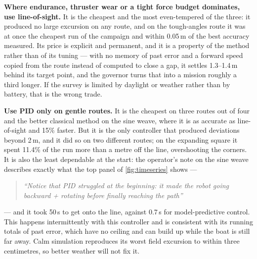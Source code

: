 \documentclass[11pt]{article}
\newcommand{\opquote}[1]{%
  \begin{quote}\itshape\small #1\end{quote}%
}
\begin{document}
\textbf{Where endurance, thruster wear or a tight force budget dominates, use
line-of-sight.} It is the cheapest and the most even-tempered of the three: it produced no
large excursion on any route, and on the tough-angles route it was at once the cheapest run
of the campaign and within 0.05\,m of the best accuracy measured. Its price is explicit and
permanent, and it is a property of the method rather than of its tuning --- with no memory of
past error and a forward speed copied from the route instead of computed to close a gap, it
settles 1.3--1.4\,m behind its target point, and the governor turns that into a mission
roughly a third longer. If the survey is limited by daylight or weather rather than by
battery, that is the wrong trade.

\textbf{Use PID only on gentle routes.} It is the cheapest on three routes out of four and
the better classical method on the sine weave, where it is as accurate as line-of-sight and
15\% faster. But it is the only controller that produced deviations beyond 2\,m, and it did
so on two different routes; on the expanding square it spent 11.4\% of the run more than a
metre off the line, overshooting the corners. It is also the least dependable at the start:
the operator's note on the sine weave describes exactly what the top panel of
\cref{fig:timeseries} shows ---

\opquote{``Notice that PID struggled at the beginning: it made the robot going backward +
rotating before finally reaching the path''}

--- and it took 50\,s to get onto the line, against 0.7\,s for model-predictive control. This
happens intermittently with this controller and is consistent with its running totals of
past error, which have no ceiling and can build up while the boat is still far away. Calm
simulation reproduces its worst field excursion to within three centimetres, so better
weather will not fix it.
\end{document}
